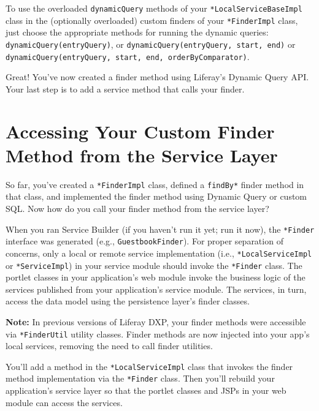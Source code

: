 \noindent\hrulefill

To use the overloaded \texttt{dynamicQuery} methods of your
\texttt{*LocalServiceBaseImpl} class in the (optionally overloaded)
custom finders of your \texttt{*FinderImpl} class, just choose the
appropriate methods for running the dynamic queries:
\texttt{dynamicQuery(entryQuery)}, or
\texttt{dynamicQuery(entryQuery,\ start,\ end)} or
\texttt{dynamicQuery(entryQuery,\ start,\ end,\ orderByComparator)}.

Great! You've now created a finder method using Liferay's Dynamic Query
API. Your last step is to add a service method that calls your finder.

\chapter{Accessing Your Custom Finder Method from the Service
Layer}\label{accessing-your-custom-finder-method-from-the-service-layer}

So far, you've created a \texttt{*FinderImpl} class, defined a
\texttt{findBy*} finder method in that class, and implemented the finder
method using Dynamic Query or custom SQL. Now how do you call your
finder method from the service layer?

When you ran Service Builder (if you haven't run it yet; run it now),
the \texttt{*Finder} interface was generated (e.g.,
\texttt{GuestbookFinder}). For proper separation of concerns, only a
local or remote service implementation (i.e., \texttt{*LocalServiceImpl}
or \texttt{*ServiceImpl}) in your service module should invoke the
\texttt{*Finder} class. The portlet classes in your application's web
module invoke the business logic of the services published from your
application's service module. The services, in turn, access the data
model using the persistence layer's finder classes.

\noindent\hrulefill

\textbf{Note:} In previous versions of Liferay DXP, your finder methods
were accessible via \texttt{*FinderUtil} utility classes. Finder methods
are now injected into your app's local services, removing the need to
call finder utilities.

\noindent\hrulefill

You'll add a method in the \texttt{*LocalServiceImpl} class that invokes
the finder method implementation via the \texttt{*Finder} class. Then
you'll rebuild your application's service layer so that the portlet
classes and JSPs in your web module can access the services.

